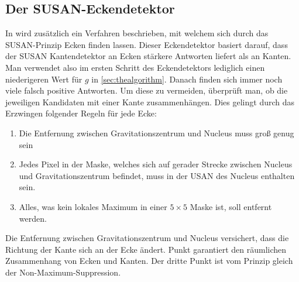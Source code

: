 \documentclass[a4paper, 11pt]{report}
\theoremstyle{definition}
\begin{document}
		\subsection{Der SUSAN-Eckendetektor}\label{ssec:corner_detector}
			In \cite{SUSAN} wird zusätzlich ein Verfahren beschrieben, mit welchem sich durch das SUSAN-Prinzip Ecken finden lassen. Dieser Eckendetektor basiert darauf, dass der SUSAN Kantendetektor an Ecken stärkere Antworten liefert als an Kanten. Man verwendet also im ersten Schritt des Eckendetektors lediglich einen niederigeren Wert für $g$ in \ref{sec:thealgorithm}.
			Danach finden sich immer noch viele falsch positive Antworten. Um diese zu vermeiden, überprüft man, ob die jeweiligen Kandidaten mit einer Kante zusammenhängen. Dies gelingt durch das Erzwingen folgender Regeln für jede Ecke:

			\begin{enumerate}
				\item Die Entfernung zwischen Gravitationszentrum und Nucleus muss groß genug sein
				\item Jedes Pixel in der Maske, welches sich auf gerader Strecke zwischen Nucleus und Gravitationszentrum befindet, muss in der USAN des Nucleus enthalten sein.
				\item Alles, was kein lokales Maximum in einer $5\times 5$ Maske ist, soll entfernt werden. 
			\end{enumerate}

			Die Entfernung zwischen Gravitationszentrum und Nucleus versichert, dass die Richtung der Kante sich an der Ecke ändert. Punkt garantiert den räumlichen Zusammenhang von Ecken und Kanten. Der dritte Punkt ist vom Prinzip gleich der Non-Maximum-Suppression.
\end{document}
